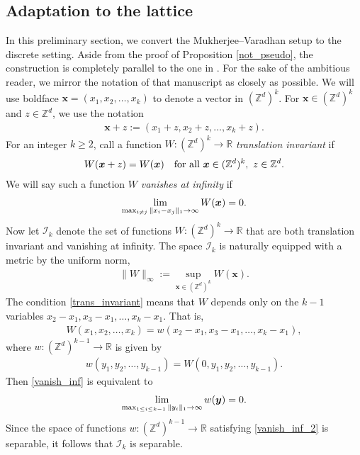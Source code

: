 \documentclass[11pt,reqno]{amsart}
\numberwithin{equation}{section}
\theoremstyle{definition}
\begin{document}
\subsection{Adaptation to the lattice}
In this preliminary section, we convert the Mukherjee--Varadhan setup to the discrete setting.
Aside from the proof of Proposition \ref{not_pseudo}, the construction is completely parallel to the one in \cite{mukherjee-varadhan14}.
For the sake of the ambitious reader, we mirror the notation of that manuscript as closely as possible.
We will use boldface ${{\boldsymbol {x}}} = (x_1,x_2,\dots,x_k)$ to denote a vector in $({\mathbb{Z}}^d)^k$.
For ${{\boldsymbol {x}}} \in ({\mathbb{Z}}^d)^k$ and $z \in {\mathbb{Z}}^d$, we use the notation
{\begin{align*} {
{{\boldsymbol {x}}}+z := (x_1+z,x_2+z,\ldots,x_k+z).
} \end{align*}}
For an integer $k \ge 2$, call a function $W : ({\mathbb{Z}}^d)^k \to {\mathbb{R}}$ \textit{translation invariant} if
{\begin{align} \begin{split} { \label{trans_invariant}
W({{\boldsymbol {x}}}+z) = W({{\boldsymbol {x}}}) \quad \text{for all ${{\boldsymbol {x}}} \in ({\mathbb{Z}}^d)^k,\ z \in {\mathbb{Z}}^d$}.
} \end{split} \end{align}}
We will say such a function $W$ \textit{vanishes at infinity} if
{\begin{align} \begin{split} { \label{vanish_inf}
\lim_{\max_{i \neq j} \|x_i - x_j\|_1 \to \infty} W({{\boldsymbol {x}}}) = 0.
} \end{split} \end{align}}
Now let ${\mathcal{I}}_k$ denote the set of functions $W : ({\mathbb{Z}}^d)^k \to {\mathbb{R}}$ that are both translation invariant and vanishing at infinity.
The space ${\mathcal{I}}_k$ is naturally equipped with a metric by the uniform norm,
{\begin{align*} {
\|W\|_\infty := \sup_{{{\boldsymbol {x}}} \in ({\mathbb{Z}}^d)^k} W({{\boldsymbol {x}}}).
} \end{align*}}
The condition \eqref{trans_invariant} means that $W$ depends only on the $k-1$ variables $x_2-x_1,x_3-x_1,\dots,x_{k}-x_{1}$.
That is,
{\begin{align*} {
W(x_1,x_2,\dots,x_k) = w(x_2-x_1,x_3-x_1,\dots,x_{k}-x_{1}),
} \end{align*}}
where $w : ({\mathbb{Z}}^d)^{k-1} \to {\mathbb{R}}$ is given by
{\begin{align*} {
w(y_1,y_2,\dots,y_{k-1}) = W(0,y_1,y_2,\dots,y_{k-1}).
} \end{align*}}
Then \eqref{vanish_inf} is equivalent to
{\begin{align} \begin{split} { \label{vanish_inf_2}
\lim_{\max_{1 \le i \le k-1} \|y_i\|_1 \to \infty} w({{\boldsymbol {y}}}) = 0.
} \end{split} \end{align}}
Since the space of functions $w : ({\mathbb{Z}}^d)^{k-1} \to {\mathbb{R}}$ satisfying \eqref{vanish_inf_2} is separable, it follows that ${\mathcal{I}}_k$ is separable.
\end{document}
